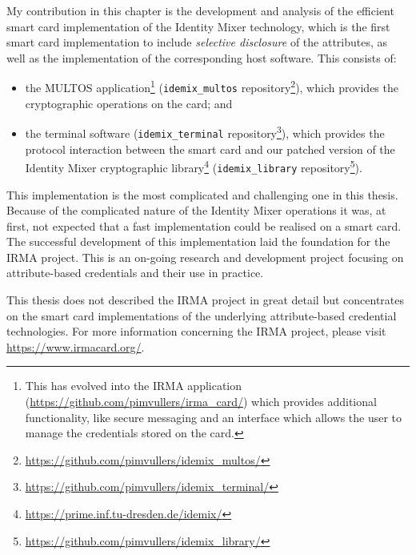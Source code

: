 My contribution in this chapter is the development and analysis of the efficient
smart card implementation of the Identity Mixer technology, 
which is the first smart card implementation to include \emph{selective 
disclosure} of the attributes, as well as the implementation of the corresponding 
host software. This consists of:
\begin{itemize}
  \item the MULTOS application\footnote{This has evolved into the IRMA
    application (\url{https://github.com/pimvullers/irma_card/}) which provides
    additional functionality, like secure messaging and an interface which
    allows the user to manage the credentials stored on the card.}
    (\texttt{idemix\_multos} repository\footnote{%
    \url{https://github.com/pimvullers/idemix_multos/}}), which provides the
    cryptographic operations on the card; and
  \item the terminal software (\texttt{idemix\_terminal} repository\footnote{%
    \url{https://github.com/pimvullers/idemix_terminal/}}), which provides the
    protocol interaction between the smart card and our patched version of the
    Identity Mixer cryptographic
    library\footnote{\url{https://prime.inf.tu-dresden.de/idemix/}}
    (\texttt{idemix\_library} repository\footnote{%
    \url{https://github.com/pimvullers/idemix_library/}}).
\end{itemize}

This implementation is the most complicated and challenging one in this thesis.
Because of the complicated nature of the Identity Mixer operations it was, at
first, not expected that a fast implementation could be realised on a smart
card. The successful development of this implementation laid the foundation for
the IRMA project. This is an on-going research and development project focusing
on attribute-based credentials and their use in practice.

This thesis does not described the IRMA project in great detail but concentrates
on the smart card implementations of the underlying attribute-based credential
technologies. For more information concerning the IRMA project, please visit
\url{https://www.irmacard.org/}.
